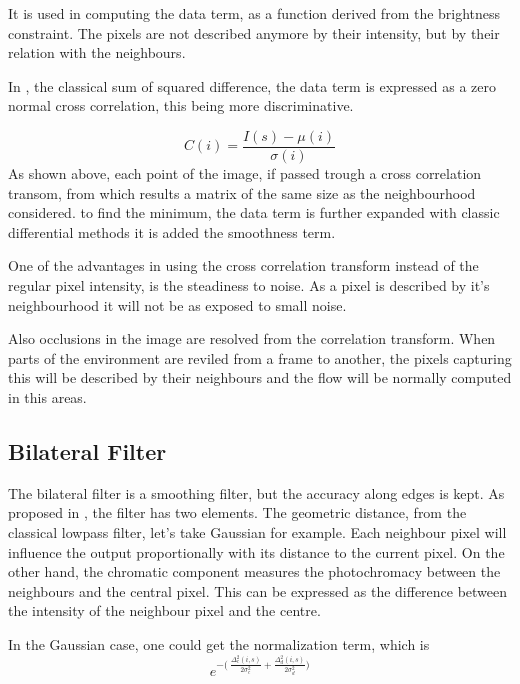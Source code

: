 \documentclass[12pt,a4paper,twoside]{report}
\begin{document}
{It is used in computing the data term, as a function derived from the brightness constraint. The pixels are not described anymore by their intensity, but by their relation with the neighbours.

In \cite{drulea2013}, the classical sum of squared difference, the data term is expressed as a zero normal cross correlation, this being more discriminative. 

\begin{equation} \label{crosscorrtrans}
C(i) = \frac{I(s)- \mu(i)}{\sigma(i)}
\end{equation}
As shown above, each point of the image, if passed trough a cross correlation transom, from which results a matrix of the same size as the neighbourhood considered. to find the minimum, the data term is further expanded with classic differential methods it is added the smoothness term.

One of the advantages in using the cross correlation transform instead of the regular pixel intensity, is the steadiness to noise. As a pixel is described by it's  neighbourhood it will not be as exposed to small noise. 

Also occlusions in the image are resolved from the correlation transform. When parts of the environment are reviled from a frame to another, the pixels capturing this will be described by their neighbours and the flow will be normally computed in this areas.

\subsection{Bilateral Filter} \label{bf}
The bilateral filter is a smoothing filter, but the accuracy along edges is kept. 
As proposed in \cite{tomasi1998bilateral}, the filter has two elements. The geometric distance, from the classical lowpass filter, let's take Gaussian for example. Each neighbour pixel will influence the output proportionally with its distance to the current pixel. On the other hand, the chromatic component measures the photochromacy between the neighbours and the central pixel. This can be expressed as the difference between the intensity of the neighbour pixel and the centre. 

In the Gaussian case, one could get the normalization term, which is
\begin{equation} \label{bilateralFilterTerm}
e^{-\big(\ \frac{\Delta_c^2(i,s)}{2\sigma_c^2}+ \frac{\Delta_d^2(i,s)}{2\sigma_d^2}\big)}
\end{equation}

}
\end{document}
